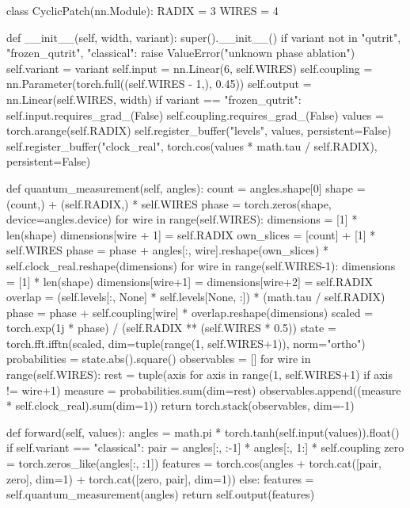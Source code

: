 \documentclass[11pt,oneside,openany]{book}
\begin{document}
\begin{BookCode}
class CyclicPatch(nn.Module):
    RADIX = 3
    WIRES = 4

    def __init__(self, width, variant):
        super().__init__()
        if variant not in {"qutrit", "frozen_qutrit", "classical"}:
            raise ValueError("unknown phase ablation")
        self.variant = variant
        self.input = nn.Linear(6, self.WIRES)
        self.coupling = nn.Parameter(torch.full((self.WIRES - 1,), 0.45))
        self.output = nn.Linear(self.WIRES, width)
        if variant == "frozen_qutrit":
            self.input.requires_grad_(False)
            self.coupling.requires_grad_(False)
        values = torch.arange(self.RADIX)
        self.register_buffer("levels", values, persistent=False)
        self.register_buffer("clock_real", torch.cos(values * math.tau / self.RADIX), persistent=False)

    def quantum_measurement(self, angles):
        count = angles.shape[0]
        shape = (count,) + (self.RADIX,) * self.WIRES
        phase = torch.zeros(shape, device=angles.device)
        for wire in range(self.WIRES):
            dimensions = [1] * len(shape)
            dimensions[wire + 1] = self.RADIX
            own_slices = [count] + [1] * self.WIRES
            phase = phase + angles[:, wire].reshape(own_slices) * self.clock_real.reshape(dimensions)
        for wire in range(self.WIRES-1):
            dimensions = [1] * len(shape)
            dimensions[wire+1] = dimensions[wire+2] = self.RADIX
            overlap = (self.levels[:, None] * self.levels[None, :]) * (math.tau / self.RADIX)
            phase = phase + self.coupling[wire] * overlap.reshape(dimensions)
        scaled = torch.exp(1j * phase) / (self.RADIX ** (self.WIRES * 0.5))
        state = torch.fft.ifftn(scaled, dim=tuple(range(1, self.WIRES+1)), norm="ortho")
        probabilities = state.abs().square()
        observables = []
        for wire in range(self.WIRES):
            rest = tuple(axis for axis in range(1, self.WIRES+1) if axis != wire+1)
            measure = probabilities.sum(dim=rest)
            observables.append((measure * self.clock_real).sum(dim=1))
        return torch.stack(observables, dim=-1)

    def forward(self, values):
        angles = math.pi * torch.tanh(self.input(values)).float()
        if self.variant == "classical":
            pair = angles[:, :-1] * angles[:, 1:] * self.coupling
            zero = torch.zeros_like(angles[:, :1])
            features = torch.cos(angles + torch.cat([pair, zero], dim=1) + torch.cat([zero, pair], dim=1))
        else:
            features = self.quantum_measurement(angles)
        return self.output(features)
\end{BookCode}
\end{document}
